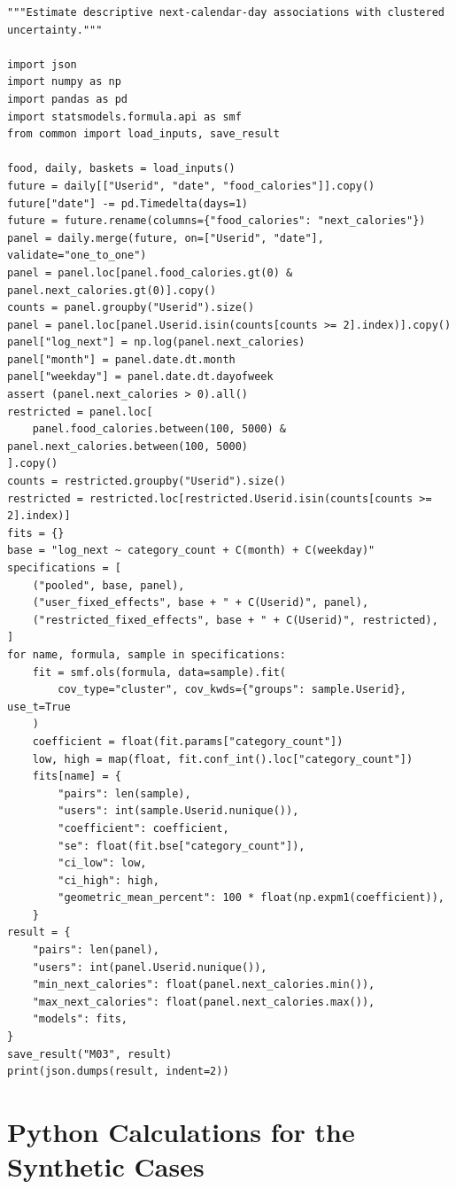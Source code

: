 \begin{Verbatim}[breaklines,breakanywhere,fontsize=\small]
"""Estimate descriptive next-calendar-day associations with clustered uncertainty."""

import json
import numpy as np
import pandas as pd
import statsmodels.formula.api as smf
from common import load_inputs, save_result

food, daily, baskets = load_inputs()
future = daily[["Userid", "date", "food_calories"]].copy()
future["date"] -= pd.Timedelta(days=1)
future = future.rename(columns={"food_calories": "next_calories"})
panel = daily.merge(future, on=["Userid", "date"], validate="one_to_one")
panel = panel.loc[panel.food_calories.gt(0) & panel.next_calories.gt(0)].copy()
counts = panel.groupby("Userid").size()
panel = panel.loc[panel.Userid.isin(counts[counts >= 2].index)].copy()
panel["log_next"] = np.log(panel.next_calories)
panel["month"] = panel.date.dt.month
panel["weekday"] = panel.date.dt.dayofweek
assert (panel.next_calories > 0).all()
restricted = panel.loc[
    panel.food_calories.between(100, 5000) & panel.next_calories.between(100, 5000)
].copy()
counts = restricted.groupby("Userid").size()
restricted = restricted.loc[restricted.Userid.isin(counts[counts >= 2].index)]
fits = {}
base = "log_next ~ category_count + C(month) + C(weekday)"
specifications = [
    ("pooled", base, panel),
    ("user_fixed_effects", base + " + C(Userid)", panel),
    ("restricted_fixed_effects", base + " + C(Userid)", restricted),
]
for name, formula, sample in specifications:
    fit = smf.ols(formula, data=sample).fit(
        cov_type="cluster", cov_kwds={"groups": sample.Userid}, use_t=True
    )
    coefficient = float(fit.params["category_count"])
    low, high = map(float, fit.conf_int().loc["category_count"])
    fits[name] = {
        "pairs": len(sample),
        "users": int(sample.Userid.nunique()),
        "coefficient": coefficient,
        "se": float(fit.bse["category_count"]),
        "ci_low": low,
        "ci_high": high,
        "geometric_mean_percent": 100 * float(np.expm1(coefficient)),
    }
result = {
    "pairs": len(panel),
    "users": int(panel.Userid.nunique()),
    "min_next_calories": float(panel.next_calories.min()),
    "max_next_calories": float(panel.next_calories.max()),
    "models": fits,
}
save_result("M03", result)
print(json.dumps(result, indent=2))
\end{Verbatim}

\hypertarget{M03-python-calculations-for-the-synthetic-cases}{%
\section{Python Calculations for the Synthetic
Cases}\label{M03-python-calculations-for-the-synthetic-cases}}

